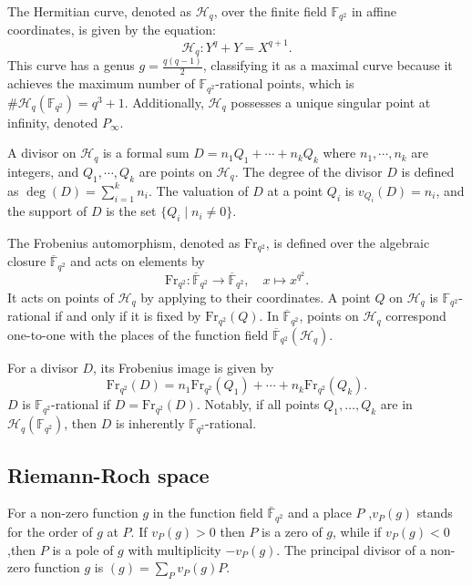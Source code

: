 \documentclass[a4paper]{amsart}
\theoremstyle{plain}
\theoremstyle{definition}
\theoremstyle{remark}
\begin{document}
The Hermitian curve, denoted as $\mathscr{H}_q$, over the finite field $\mathbb{F}_{q^2}$ in affine coordinates, is given by the equation:
\[
	\mathscr{H}_q: Y^q + Y = X^{q+1}.
\]
This curve has a genus $g = \frac{q(q-1)}{2}$, classifying it as a maximal curve because it achieves the maximum number of $\mathbb{F}_{q^2}$-rational points, which is $\#\mathscr{H}_q(\mathbb{F}_{q^2}) = q^3 + 1$. Additionally, $\mathscr{H}_q$ possesses a unique singular point at infinity, denoted $P_{\infty}$.

A divisor on $\mathscr{H}_q$ is a formal sum $D = n_1 Q_1 + \cdots + n_k Q_k$ where $n_1, \cdots, n_k$ are integers, and $Q_1, \cdots, Q_k$ are points on $\mathscr{H}_q$. The degree of the divisor $D$ is defined as $\deg(D) = \sum_{i=1}^k n_i$. The valuation of $D$ at a point $Q_i$ is $v_{Q_i}(D) = n_i$, and the support of $D$ is the set $\{ Q_i \mid n_i \neq 0 \}$.

The Frobenius automorphism, denoted as $\text{Fr}_{q^2}$, is defined over the algebraic closure $\overline{\mathbb{F}}_{q^2}$ and acts on elements by
\[
	\text{Fr}_{q^2}: \overline{\mathbb{F}}_{q^2} \to \overline{\mathbb{F}}_{q^2}, \quad x \mapsto x^{q^2}.
\]
It acts on points of $\mathscr{H}_q$ by applying to their coordinates. A point $Q$ on $\mathscr{H}_q$ is $\mathbb{F}_{q^2}$-rational if and only if it is fixed by $\text{Fr}_{q^2}(Q)$. In $\overline{\mathbb{F}}_{q^2}$, points on $\mathscr{H}_q$ correspond one-to-one with the places of the function field $\overline{\mathbb{F}}_{q^2}(\mathscr{H}_q)$.

For a divisor $D$, its Frobenius image is given by
\[
	\text{Fr}_{q^2}(D) = n_1 \text{Fr}_{q^2}(Q_1) + \cdots + n_k \text{Fr}_{q^2}(Q_k).
\]
$D$ is $\mathbb{F}_{q^2}$-rational if $D = \text{Fr}_{q^2}(D)$. Notably, if all points $Q_1, \ldots, Q_k$ are in $\mathscr{H}_q(\mathbb{F}_{q^2})$, then $D$ is inherently $\mathbb{F}_{q^2}$-rational.



\subsection*{Riemann-Roch space}

For a non-zero function $g$ in the function field $\bar{\mathbb{F}}_{q^2}$ and a place $P$ ,$v_P(g)$ stands for the order of $g$ at $P$. If $v_P(g) > 0$ then $P$ is a zero of $g$, while if $v_P(g) < 0 $,then $P$ is a pole of $g$ with multiplicity  $-v_P(g)$. The principal divisor of a non-zero function $g$ is $(g)= \sum_{P}v_P(g) P$.
\end{document}
